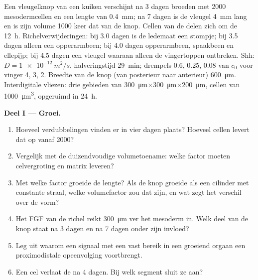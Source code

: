 \begin{problem}
\label{pb:b2:limb-organogenesis:1}
Een vleugelknop van een kuiken verschijnt na 3 dagen broeden met \num{2000}
mesodermcellen en een lengte van \qty{0.4}{mm}; na 7 dagen is de vleugel
\qty{4}{mm} lang en is zijn volume \num{1000} keer dat van de knop. Cellen
van de  delen zich om de \qty{12}{h}. Richelverwijderingen:
bij 3.0 dagen is de ledemaat een stompje; bij 3.5 dagen alleen een
opperarmbeen; bij 4.0 dagen opperarmbeen, spaakbeen en ellepijp; bij 4.5
dagen een vleugel waaraan alleen de vingertoppen ontbreken.
Shh: $D = \qty{1e-12}{m^2/s}$, halveringstijd \qty{29}{min}; drempels
$0.6$, $0.25$, $0.08$ van $c_0$ voor vinger 4, 3, 2. Breedte van de knop
(van posterieur naar anterieur) \qty{600}{\micro m}. Interdigitale vliezen:
drie gebieden van
\qty{300}{\micro m}$\times$\qty{300}{\micro m}$\times$\qty{200}{\micro m},
cellen van \qty{1000}{\micro m^3}, opgeruimd in \qty{24}{h}.

\medskip
\noindent\textbf{Deel I --- Groei.}
\begin{enumerate}
  \item Hoeveel verdubbelingen vinden er in vier dagen plaats? Hoeveel
        cellen levert dat op vanaf \num{2000}?
  \item Vergelijk met de duizendvoudige volumetoename: welke factor moeten
        celvergroting en matrix leveren?
  \item Met welke factor groeide de lengte? Als de knop groeide als een
        cilinder met constante straal, welke volumefactor zou dat zijn, en
        wat zegt het verschil over de vorm?
  \item Het FGF van de richel reikt \qty{300}{\micro m} ver het mesoderm in.
        Welk deel van de knop staat na 3 dagen en na 7 dagen onder zijn
        invloed?
  \item Leg uit waarom een signaal met een vast bereik in een groeiend
        orgaan een proximodistale opeenvolging voortbrengt.
  \item Een cel verlaat de  na 4 dagen. Bij welk segment
        sluit ze aan?
\end{enumerate}


\end{problem}

